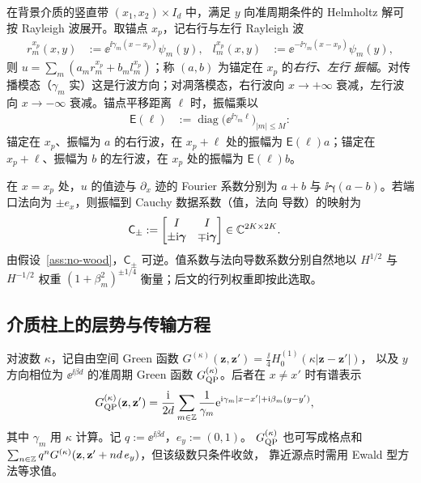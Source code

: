 在背景介质的竖直带 $(x_1,x_2)\times I_d$ 中，满足 $y$ 向准周期条件的 Helmholtz 解可按
Rayleigh 波展开。取锚点 $x_p$，记右行与左行 Rayleigh 波
\begin{align}
  r_m^{x_p}(x,y)&:=\ee^{\ii\gamma_m(x-x_p)}\psi_m(y),
  &l_m^{x_p}(x,y)&:=\ee^{-\ii\gamma_m(x-x_p)}\psi_m(y),
  \label{eq:rayleigh-waves}
\end{align}
则 $u=\sum_m(a_mr_m^{x_p}+b_ml_m^{x_p})$；称 $(a,b)$ 为锚定在 $x_p$ 的\emph{右行、左行
振幅}。对传播模态（$\gamma_m$ 实）这是行波方向；对凋落模态，右行波向 $x\to+\infty$
衰减，左行波向 $x\to-\infty$ 衰减。锚点平移距离 $\ell$ 时，振幅乘以
\begin{align}
  \mathsf E(\ell)&:=\operatorname{diag}\bigl(\ee^{\ii\gamma_m\ell}\bigr)_{|m|\leq M}:
  \label{eq:anchor-shift}
\end{align}
锚定在 $x_p$、振幅为 $a$ 的右行波，在 $x_p+\ell$ 处的振幅为 $\mathsf E(\ell)a$；锚定在
$x_p+\ell$、振幅为 $b$ 的左行波，在 $x_p$ 处的振幅为 $\mathsf E(\ell)b$。

在 $x=x_p$ 处，$u$ 的值迹与 $\partial_x$ 迹的 Fourier 系数分别为 $a+b$ 与
$\ii\boldsymbol\gamma(a-b)$。若端口法向为 $\pm e_x$，则振幅到 Cauchy 数据系数（值，法向
导数）的映射为
\begin{align}
  \mathsf C_\pm
  &:=\begin{bmatrix}I&I\\ \pm\mathrm{i}\boldsymbol\gamma&\mp\mathrm{i}\boldsymbol\gamma\end{bmatrix}
  \in\mathbb{C}^{2K\times2K}.
  \label{eq:amplitude-to-cauchy}
\end{align}
由假设~\ref{ass:no-wood}，$\mathsf C_\pm$ 可逆。值系数与法向导数系数分别自然地以
$H^{1/2}$ 与 $H^{-1/2}$ 权重 $(1+\beta_m^2)^{\pm1/4}$ 衡量；后文的行列权重即按此选取。

\subsection{介质柱上的层势与传输方程}
\label{subsec:layer-potentials}

对波数 $\kappa$，记自由空间 Green 函数
$G^{(\kappa)}(\mathbf z,\mathbf z')=\frac{\ii}{4}H_0^{(1)}(\kappa|\mathbf z-\mathbf z'|)$，
以及 $y$ 方向相位为 $\ee^{\ii\beta d}$ 的准周期 Green 函数 $G^{(\kappa)}_{\mathrm{QP}}$。后者在
$x\ne x'$ 时有谱表示\cite{Linton1998}
\begin{align}
  G^{(\kappa)}_{\mathrm{QP}}(\mathbf z,\mathbf z')
  &=\frac{\mathrm{i}}{2d}\sum_{m\in\mathbb{Z}}\frac{1}{\gamma_m}
    \mathrm{e}^{\mathrm{i}\gamma_m|x-x'|+\mathrm{i}\beta_m(y-y')},
  \label{eq:qp-green-spectral}
\end{align}
其中 $\gamma_m$ 用 $\kappa$ 计算。记 $q:=\ee^{\ii\beta d}$，$e_y:=(0,1)$。
$G^{(\kappa)}_{\mathrm{QP}}$ 也可写成格点和 $\sum_{n\in\mathbb{Z}}q^nG^{(\kappa)}(\mathbf z,\mathbf z'+nd\,e_y)$，但该级数只条件收敛，
靠近源点时需用 Ewald 型方法等求值\cite{Linton1998}。


